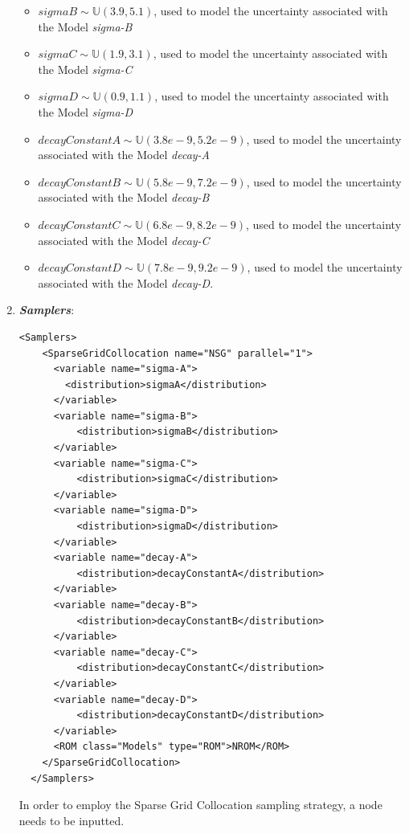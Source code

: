 \begin{enumerate}
\begin{itemize}
    \item $sigmaB \sim \mathbb{U}(3.9,5.1)$, used to model the uncertainty 
    associated with  the Model \textit{sigma-B}
    \item $sigmaC \sim \mathbb{U}(1.9,3.1)$, used to model the uncertainty 
    associated with  the Model \textit{sigma-C}
    \item $sigmaD \sim \mathbb{U}(0.9,1.1)$, used to model the uncertainty 
    associated with  the Model \textit{sigma-D}
    \item  $decayConstantA \sim \mathbb{U}(3.8e-9,5.2e-9)$,  used to 
    model the uncertainty 
    associated with  the Model \textit{decay-A}
    \item  $decayConstantB \sim \mathbb{U}(5.8e-9,7.2e-9)$,  used to 
    model the uncertainty 
    associated with  the Model \textit{decay-B}
    \item  $decayConstantC \sim \mathbb{U}(6.8e-9,8.2e-9)$,  used to 
    model the uncertainty 
    associated with  the Model \textit{decay-C}
    \item  $decayConstantD \sim \mathbb{U}(7.8e-9,9.2e-9)$,  used to 
    model the uncertainty 
    associated with  the Model \textit{decay-D}.
  \end{itemize}
   \item \textbf{\textit{Samplers}}:
\begin{lstlisting}[style=XML,morekeywords={arg,extension,pauseAtEnd,overwrite}]
  <Samplers>
    <SparseGridCollocation name="NSG" parallel="1">
      <variable name="sigma-A">
        <distribution>sigmaA</distribution>
      </variable>
      <variable name="sigma-B">
          <distribution>sigmaB</distribution>
      </variable>
      <variable name="sigma-C">
          <distribution>sigmaC</distribution>
      </variable>
      <variable name="sigma-D">
          <distribution>sigmaD</distribution>
      </variable>
      <variable name="decay-A">
          <distribution>decayConstantA</distribution>
      </variable>
      <variable name="decay-B">
          <distribution>decayConstantB</distribution>
      </variable>
      <variable name="decay-C">
          <distribution>decayConstantC</distribution>
      </variable>
      <variable name="decay-D">
          <distribution>decayConstantD</distribution>
      </variable>
      <ROM class="Models" type="ROM">NROM</ROM>
    </SparseGridCollocation>
  </Samplers> 
\end{lstlisting}
  In order to employ the Sparse Grid Collocation sampling strategy, a 
   node needs to be inputted. 

\end{enumerate}
